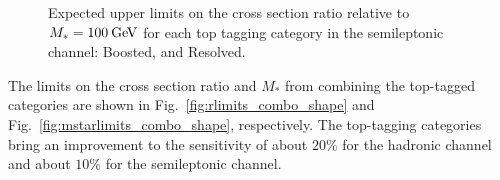 \begin{figure}[htbp]
\begin{center}
  \caption{Expected upper limits on the cross section ratio relative to $M_*=100\:\mathrm{Ge\kern -0.1em V}$ for each top tagging category in the semileptonic channel:  Boosted, and  Resolved.}
  \label{fig:rlimits_semilept_toptag_shape}
\end{center}
\end{figure}

The limits on the cross section ratio and $M_*$ from combining the top-tagged categories are shown in Fig.~\ref{fig:rlimits_combo_shape} and Fig.~\ref{fig:mstarlimits_combo_shape}, respectively. The top-tagging categories bring an improvement to the sensitivity of about $20\%$ for the hadronic channel and about $10\%$ for the semileptonic channel.

